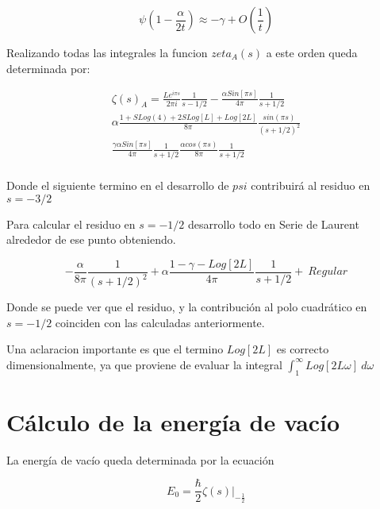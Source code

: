 \begin{equation}
    \psi(1-\frac{\alpha}{2 t}) \approx 
    -\gamma + O(\frac{1}{t})
\end{equation}

Realizando todas las integrales la funcion $zeta _A (s)$ a este orden queda determinada por:  

\begin{equation}
\begin{array}{c}
    \zeta (s) _{A} = 
    \frac{L e ^{i \pi s}}{2 \pi i} \frac{1}{s-1/2} 
    -\frac{\alpha Sin[\pi s]}{4 \pi} \frac{1}{s+1/2} \\
    \alpha 
    \frac{
    1+S Log(4)+2SLog[L]+Log[2L]
    }
    {8 \pi} \frac{sin(\pi s)}{(s+1/2) ^2}  \\
    \frac{\gamma \alpha Sin[\pi s]}{4 \pi } \frac{1}{s+1/2} 
    \frac{\alpha cos(\pi s) }{8 \pi}  \frac{1}{s+1/2}  \\
\end{array}
\end{equation}

Donde el siguiente termino en el desarrollo de $psi$ contribuirá al residuo en $s = -3/2$

Para calcular el residuo en $s=-1/2$ desarrollo todo en Serie de Laurent alrededor de ese punto obteniendo.

\begin{equation}
    - \frac{\alpha}{8 \pi} \frac{1}{(s+1/2)^2} + 
    \alpha \frac{1-\gamma -Log[2 L]}{4 \pi} \frac{1}{s+1/2} + \ Regular
\label{eq.desarrollo}
\end{equation}

Donde se puede ver que el residuo, y la contribución al polo cuadrático en $s=-1/2$ coinciden con las calculadas anteriormente.

Una aclaracion importante es que el termino $Log[2 L ]$ es correcto dimensionalmente, ya que proviene de evaluar la integral $\int _1 ^\infty
 Log[2 L \omega] \ d \omega$

\section{Cálculo de la energía de vacío}

La energía de vacío queda determinada por la ecuación 

\begin{equation}
    E _0 = \frac{\hbar}{2}  
    \zeta (s)  |  _{- \frac{1}{2}}
\end{equation}

